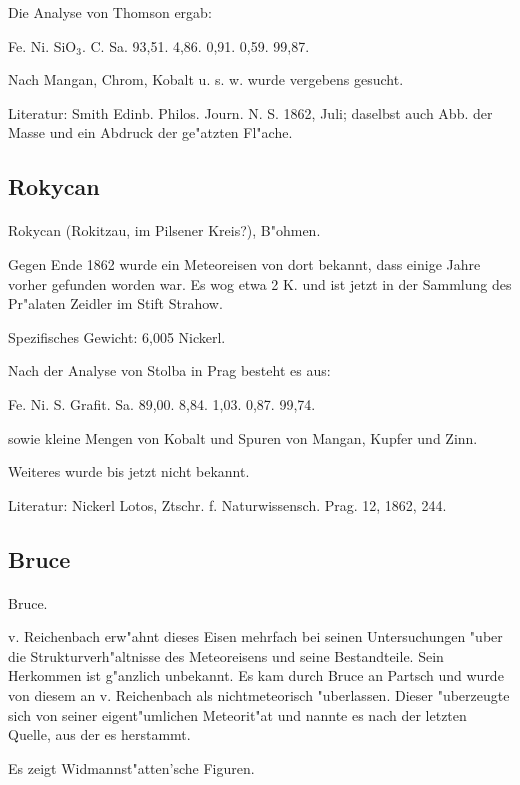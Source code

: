 \documentclass[a4paper, 11pt, oneside]{article}
\begin{document}
Die Analyse von Thomson ergab:

Fe. Ni. SiO$_{3}$. C. Sa.  
93,51. 4,86. 0,91. 0,59. 99,87.

Nach Mangan, Chrom, Kobalt u. s. w. wurde vergebens gesucht.

Literatur: Smith Edinb. Philos. Journ. N. S. 1862, Juli; daselbst auch Abb. der Masse und ein Abdruck der ge"atzten Fl"ache.

\subsection{Rokycan}
\normalsize
\paragraph{}
Rokycan (Rokitzau, im Pilsener Kreis?), B"ohmen.

Gegen Ende 1862 wurde ein Meteoreisen von dort bekannt, dass einige Jahre vorher gefunden worden war. Es wog etwa 2 K. und ist jetzt in der Sammlung des Pr"alaten Zeidler im Stift Strahow.

Spezifisches Gewicht: 6,005 Nickerl.

Nach der Analyse von Stolba in Prag besteht es aus:

Fe. Ni. S. Grafit. Sa.  
89,00. 8,84. 1,03. 0,87. 99,74.

sowie kleine Mengen von Kobalt und Spuren von Mangan, Kupfer und Zinn.

Weiteres wurde bis jetzt nicht bekannt.

Literatur: Nickerl Lotos, Ztschr. f. Naturwissensch. Prag. 12, 1862, 244.

\subsection{Bruce}
\normalsize
\paragraph{}
Bruce.

v. Reichenbach erw"ahnt dieses Eisen mehrfach bei seinen Untersuchungen "uber die Strukturverh"altnisse des Meteoreisens und seine Bestandteile. Sein Herkommen ist g"anzlich unbekannt. Es kam durch Bruce an Partsch und wurde von diesem an v. Reichenbach als nichtmeteorisch "uberlassen. Dieser "uberzeugte sich von seiner eigent"umlichen Meteorit"at und nannte es nach der letzten Quelle, aus der es herstammt.

Es zeigt Widmannst"atten'sche Figuren.
\end{document}
